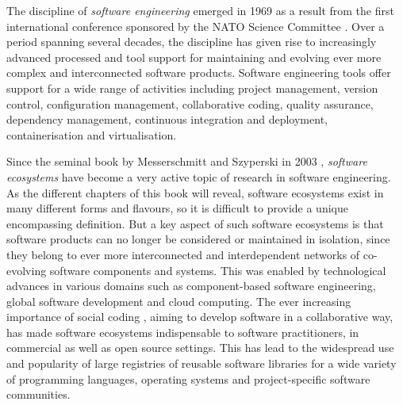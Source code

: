 %
%

\preface


The discipline of \emph{software engineering} emerged in 1969 as a result from the first international conference sponsored by the NATO Science Committee \cite{Naur1969}.
Over a period spanning several decades, the discipline has given rise to increasingly advanced processed and tool support for maintaining and evolving ever more complex and interconnected software products.
Software engineering tools offer support for a wide range of activities including project management, version control, configuration management, collaborative coding, quality assurance, dependency management, continuous integration and deployment, containerisation and virtualisation.

Since the seminal book by Messerschmitt and Szyperski in 2003 \cite{messerschmitt2003software}, \emph{software ecosystems} have become a very active topic of research in software engineering. 
As the different chapters of this book will reveal, software ecosystems exist in many different forms and flavours, so it is difficult to provide a unique encompassing definition.
 But a key aspect of such software ecosystems is that software products can no longer be considered or maintained in isolation, since they belong to ever more interconnected and interdependent networks of co-evolving software components and systems.
This was enabled by technological advances in various domains such as component-based software engineering, global software development and cloud computing. 
The ever increasing importance of social coding \cite{Dabbish2012}, aiming to develop software in a collaborative way, has made software ecosystems indispensable to software practitioners, in commercial as well as open source settings.
This has lead to the widespread use and popularity of large registries of reusable software libraries for a wide variety of programming languages, operating systems and project-specific software communities.



